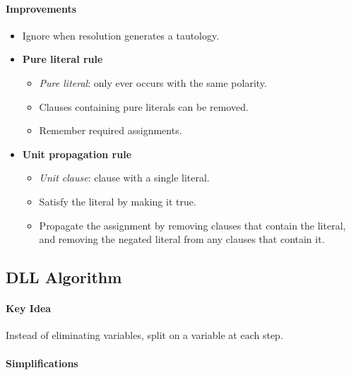 \documentclass[twocolumn,english]{article}
\begin{document}
\paragraph{Improvements}
\begin{itemize}
\item Ignore when resolution generates a tautology.
\item \textbf{Pure literal rule}
\begin{itemize}
\item \emph{Pure literal}: only ever occurs with the same polarity. 
\item Clauses containing pure literals can be removed.
\item Remember required assignments.
\end{itemize}
\item \textbf{Unit propagation rule}
\begin{itemize}
\item \emph{Unit clause}: clause with a single literal.
\item Satisfy the literal by making it true.
\item Propagate the assignment by removing clauses that contain the literal,
and removing the negated literal from any clauses that contain it.
\end{itemize}
\end{itemize}

\subsection{DLL Algorithm}

\paragraph{Key Idea}

Instead of eliminating variables, split on a variable at each step.

\paragraph{Simplifications}
\end{document}

